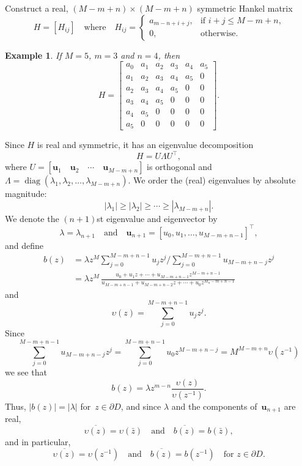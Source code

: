 \documentclass[12pt,a4paper]{article}
\newtheorem{example}[theorem]{Example}
\newcommand{\diag}{\operatorname{diag}}
\begin{document}
Construct a real, $(M-m+n)\times(M-m+n)$ symmetric Hankel matrix
\[
H=[H_{ij}]\quad\text{where}\quad
H_{ij}=\begin{cases}
    a_{m-n+i+j},&\text{if $i+j\le M-m+n$,}\\
    0,&\text{otherwise.}
\end{cases}
\]

\begin{example}
If $M=5$, $m=3$ and $n=4$, then
\[
H=\begin{bmatrix}
a_0&a_1&a_2&a_3&a_4&a_5\\
a_1&a_2&a_3&a_4&a_5&0\\
a_2&a_3&a_4&a_5&0  &0\\
a_3&a_4&a_5&0  &0  &0\\
a_4&a_5&0  &0  &0  &0\\
a_5&0  &0  &0  &0  &0
\end{bmatrix}.
\]
\end{example}

Since $H$ is real and symmetric, it has an eigenvalue decomposition
\[
H=U\Lambda U^\top,
\]
where $U=[\boldsymbol{u}_1\quad\boldsymbol{u}_2\quad\cdots
\quad\boldsymbol{u}_{M-m+n}]$ is orthogonal and 
$\Lambda=\diag(\lambda_1,\lambda_2,\ldots,
\lambda_{M-m+n})$.  We order the (real) eigenvalues by absolute magnitude:
\[
|\lambda_1|\ge|\lambda_2|\ge\cdots\ge|\lambda_{M-m+n}|.
\]
We denote the $(n+1)$st eigenvalue and eigenvector by
\[
\lambda=\lambda_{n+1}\quad\text{and}\quad
\boldsymbol{u}_{n+1}=[u_0,u_1,\ldots,u_{M-m+n-1}]^\top,
\]
and define
\begin{align*}
b(z)&=\lambda z^M\sum_{j=0}^{M-m+n-1}u_jz^j\bigg/
\sum_{j=0}^{M-m+n-1}u_{M-m+n-j}z^j\\
    &=\lambda z^M\,\frac{u_0+u_1z+\cdots+u_{M-m+n-1}z^{M-m+n-1}}%
{u_{M-m+n-1}+u_{M-m+n-2}z+\cdots+u_0z^{M_n-m+n-1}}
\end{align*}
and
\[
\upsilon(z)=\sum_{j=0}^{M-m+n-1}u_jz^j.
\]
Since
\[
\sum_{j=0}^{M-m+n-1}u_{M-m+n-j}z^j=\sum_{j=0}^{M-m+n-1}u_0z^{M-m+n-j}
    =M^{M-m+n}\upsilon(z^{-1})
\]
we see that
\[
b(z)=\lambda z^{m-n}\frac{\upsilon(z)}{\upsilon(z^{-1})}.
\]
Thus, $|b(z)|=|\lambda|$ for~$z\in\partial D$, and since $\lambda$ and the 
components of~$\boldsymbol{u}_{n+1}$ are real,
\begin{equation}\label{eq: b zbar}
\overline{\upsilon(z)}=\upsilon(\bar z)\quad\text{and}\quad
\overline{b(z)}=b(\bar z), 
\end{equation}
and in particular,
\[
\overline{\upsilon(z)}=\upsilon(z^{-1})\quad\text{and}\quad
\overline{b(z)}=b(z^{-1})\quad\text{for $z\in\partial D$.}
\]
\end{document}
